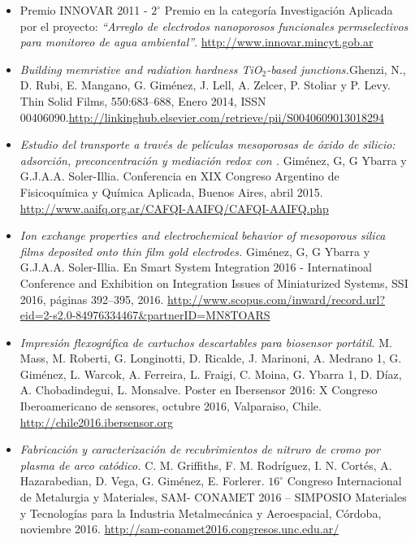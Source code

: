   \begin{itemize}[leftmargin=0cm,label={}]
  	
  	\item Premio INNOVAR 2011 - $2^\circ$ Premio en la categoría Investigación Aplicada por el proyecto: \textit{``Arreglo de electrodos nanoporosos funcionales permselectivos para monitoreo de agua ambiental''}. \url{http://www.innovar.mincyt.gob.ar}
   
    \item \textit{Building memristive and radiation hardness TiO$_2$-based junctions.}\linebreak Ghenzi, N., D. Rubi, E. Mangano, G. Giménez, J. Lell, A. Zelcer, P. Stoliar y P. Levy. Thin Solid Films, 550:683–688, Enero 2014, ISSN 00406090.\url{http://linkinghub.elsevier.com/retrieve/pii/S0040609013018294}

    \item \textit{Estudio del transporte a través de películas mesoporosas de óxido de silicio: adsorción, preconcentración y mediación redox con \aminorutenioCompleto.} Giménez, G, G Ybarra y G.J.A.A. Soler-Illia. Conferencia en XIX Congreso Argentino de Fisicoquímica y Química Aplicada, Buenos Aires, abril 2015. \url{http://www.aaifq.org.ar/CAFQI-AAIFQ/CAFQI-AAIFQ.php}
    
    \item \textit{Ion exchange properties and electrochemical behavior of mesoporous silica films deposited onto thin film gold electrodes.} Giménez, G, G Ybarra y G.J.A.A. Soler-Illia. En Smart System Integration 2016 - Internatinoal Conference and
    Exhibition on Integration Issues of Miniaturized Systems, SSI 2016, páginas 392–395, 2016. \url{http://www.scopus.com/inward/record.url?eid=2-s2.0-84976334467&partnerID=MN8TOARS}
    
    \item \textit{Impresión flexográfica de cartuchos descartables para biosensor portátil.} M. Mass, M. Roberti, G. Longinotti, D. Ricalde, J. Marinoni, A. Medrano 1, G. Giménez, L. Warcok, A. Ferreira, L. Fraigi, C. Moina, G. Ybarra 1, D. Díaz, A. Chobadindegui, L. Monsalve. Poster en Ibersensor 2016: X Congreso Iberoamericano de sensores, octubre 2016, Valparaiso,  Chile. \url{http://chile2016.ibersensor.org}
    
    \item \textit{Fabricación y caracterización de recubrimientos de nitruro de cromo por plasma de arco catódico.} C. M. Griffiths, F. M. Rodríguez, I. N. Cortés, A. Hazarabedian, D. Vega, G. Giménez, E. Forlerer. $16^\circ$ Congreso Internacional de Metalurgia y Materiales, SAM-
CONAMET 2016 – SIMPOSIO Materiales y Tecnologías para la Industria Metalmecánica y Aeroespacial, Córdoba, noviembre 2016. \url{http://sam-conamet2016.congresos.unc.edu.ar/}


\end{itemize}
